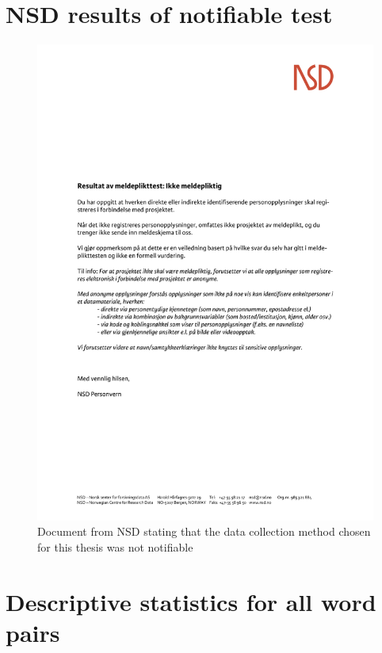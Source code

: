 \section{NSD results of notifiable test}
    \label{NSD}

 \begin{figure}[H]
        \centering
        \includegraphics[scale=0.5]{figures/ikke_meldepliktig.png}
        \caption{Document from NSD stating that the data collection method chosen for this thesis was not notifiable}
        \label{fig:ikkemeld}
    \end{figure}

\section{Descriptive statistics for all word pairs}
        \label{desstat}

